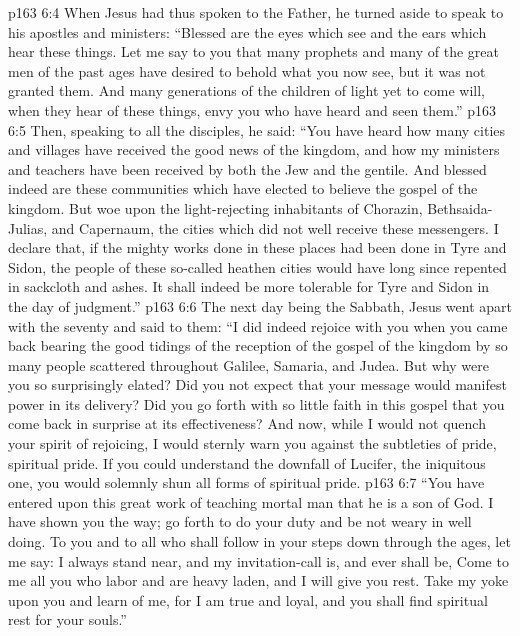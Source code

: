 \vs p163 6:4 When Jesus had thus spoken to the Father, he turned aside to speak to his apostles and ministers: \textcolor{ubdarkred}{“Blessed are the eyes which see and the ears which hear these things. Let me say to you that many prophets and many of the great men of the past ages have desired to behold what you now see, but it was not granted them. And many generations of the children of light yet to come will, when they hear of these things, envy you who have heard and seen them.”}
\vs p163 6:5 Then, speaking to all the disciples, he said: \textcolor{ubdarkred}{“You have heard how many cities and villages have received the good news of the kingdom, and how my ministers and teachers have been received by both the Jew and the gentile. And blessed indeed are these communities which have elected to believe the gospel of the kingdom. But woe upon the light\hyp{}rejecting inhabitants of Chorazin, Bethsaida\hyp{}Julias, and Capernaum, the cities which did not well receive these messengers. I declare that, if the mighty works done in these places had been done in Tyre and Sidon, the people of these so\hyp{}called heathen cities would have long since repented in sackcloth and ashes. It shall indeed be more tolerable for Tyre and Sidon in the day of judgment.”}
\vs p163 6:6 \pc The next day being the Sabbath, Jesus went apart with the seventy and said to them: \textcolor{ubdarkred}{“I did indeed rejoice with you when you came back bearing the good tidings of the reception of the gospel of the kingdom by so many people scattered throughout Galilee, Samaria, and Judea. But why were you so surprisingly elated? Did you not expect that your message would manifest power in its delivery? Did you go forth with so little faith in this gospel that you come back in surprise at its effectiveness? And now, while I would not quench your spirit of rejoicing, I would sternly warn you against the subtleties of pride, spiritual pride. If you could understand the downfall of Lucifer, the iniquitous one, you would solemnly shun all forms of spiritual pride.}
\vs p163 6:7 \textcolor{ubdarkred}{“You have entered upon this great work of teaching mortal man that he is a son of God. I have shown you the way; go forth to do your duty and be not weary in well doing. To you and to all who shall follow in your steps down through the ages, let me say: I always stand near, and my invitation\hyp{}call is, and ever shall be, Come to me all you who labor and are heavy laden, and I will give you rest. Take my yoke upon you and learn of me, for I am true and loyal, and you shall find spiritual rest for your souls.”}
